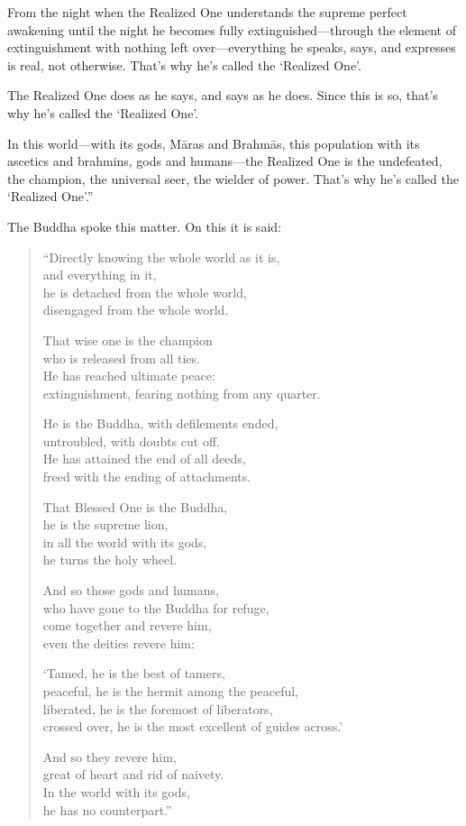\documentclass[12pt,openany]{book}%
\begin{document}
From the night when the Realized One understands the supreme perfect awakening until the night he becomes fully extinguished—through the element of extinguishment with nothing left over—everything he speaks, says, and expresses is real, not otherwise. That’s why he’s called the ‘Realized One’. 

The Realized One does as he says, and says as he does. Since this is so, that’s why he’s called the ‘Realized One’. 

In this world—with its gods, \textsanskrit{Māras} and \textsanskrit{Brahmās}, this population with its ascetics and brahmins, gods and humans—the Realized One is the undefeated, the champion, the universal seer, the wielder of power. That’s why he’s called the ‘Realized One’.” 

The Buddha spoke this matter. On this it is said: 

\begin{verse}%
“Directly knowing the whole world as it is, \\
and everything in it, \\
he is detached from the whole world, \\
disengaged from the whole world. 

That wise one is the champion \\
who is released from all ties. \\
He has reached ultimate peace: \\
extinguishment, fearing nothing from any quarter. 

He is the Buddha, with defilements ended, \\
untroubled, with doubts cut off. \\
He has attained the end of all deeds, \\
freed with the ending of attachments. 

That Blessed One is the Buddha, \\
he is the supreme lion, \\
in all the world with its gods, \\
he turns the holy wheel. 

And so those gods and humans, \\
who have gone to the Buddha for refuge, \\
come together and revere him, \\
even the deities revere him: 

‘Tamed, he is the best of tamers, \\
peaceful, he is the hermit among the peaceful, \\
liberated, he is the foremost of liberators, \\
crossed over, he is the most excellent of guides across.’ 

And so they revere him, \\
great of heart and rid of naivety. \\
In the world with its gods, \\
he has no counterpart.” 

%
\end{verse}
\end{document}
